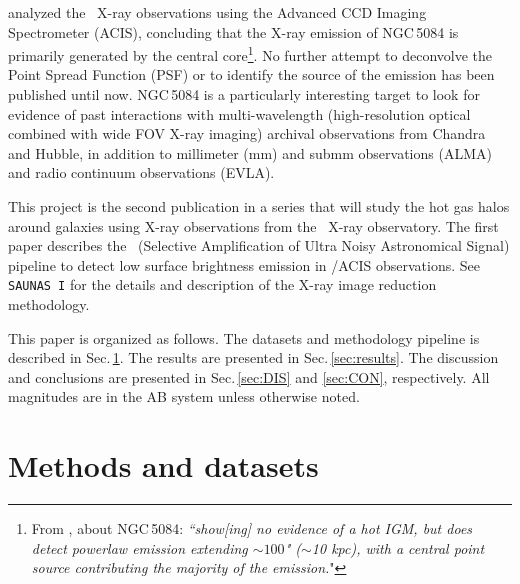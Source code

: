 \documentclass[modern]{CORE-AAS/aastex631}
\begin{document}
{\citet{osullivan+2017mnras472_1482} analyzed the \Chandra\ X-ray observations using the Advanced CCD Imaging Spectrometer (ACIS), concluding that the X-ray emission of NGC\,5084 is primarily generated by the central core\footnote{From \citet{osullivan+2017mnras472_1482}, about NGC\,5084: \emph{``show[ing] no evidence of a hot IGM, but does detect powerlaw emission extending $\sim100$" ($\sim$10 kpc), with a central point
source contributing the majority of the emission.}"}. No further attempt to deconvolve the Point Spread Function (PSF) or to identify the source of the emission has been published until now.  NGC\,5084 is a particularly interesting target to look for evidence of past interactions with multi-wavelength (high-resolution optical combined with wide FOV X-ray imaging) archival observations from Chandra and Hubble, in addition to millimeter (mm) and submm observations (ALMA) and radio continuum observations (EVLA). 


This project is the second publication in a series that will study the hot gas halos around galaxies using X-ray observations from the \Chandra\ X-ray observatory. The first paper \citep[first thing][\texttt{SAUNAS I}, hereafter]{borlaff+2024apj967_169} describes the \SAUNAS\ (Selective Amplification of Ultra Noisy Astronomical Signal) pipeline to detect low surface brightness emission in \Chandra/ACIS observations. See \texttt{SAUNAS I} for the details and description of the X-ray image reduction methodology. \par 
This paper is organized as follows. The datasets and methodology pipeline is described in Sec.\,\ref{sec:methods}. The results are presented in Sec.\,\ref{sec:results}. The discussion and conclusions are presented in Sec.\,\ref{sec:DIS} and \ref{sec:CON}, respectively. All magnitudes are in the AB system \citep{oke1971apj170_193} unless otherwise noted.

\section{Methods and datasets} \label{sec:methods}

}
\end{document}
